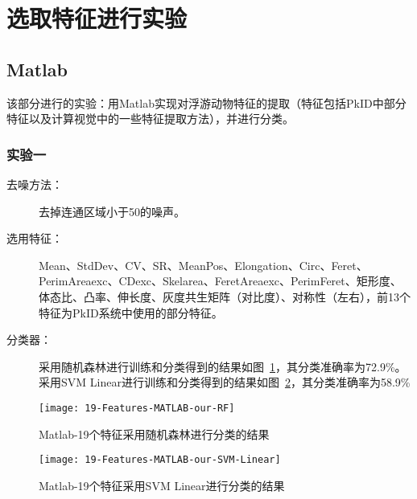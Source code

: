 \section{选取特征进行实验}
\subsection{Matlab}
该部分进行的实验：用Matlab实现对浮游动物特征的提取（特征包括PkID中部分特征以及计算视觉中的一些特征提取方法），并进行分类。

\subsubsection{实验一}
\begin{description}
\item[去噪方法：] 去掉连通区域小于50的噪声。
\item[选用特征：] Mean、StdDev、CV、SR、MeanPos、Elongation、Circ、Feret、PerimAreaexc、CDexc、Skelarea、FeretAreaexc、PerimFeret、矩形度、体态比、凸率、伸长度、灰度共生矩阵（对比度）、对称性（左右），前13个特征为PkID系统中使用的部分特征。
\item[分类器：] 采用随机森林进行训练和分类得到的结果如图~\ref{fig:19-Features-MATLAB-our-RF}，其分类准确率为72.9\%。采用SVM Linear进行训练和分类得到的结果如图~\ref{fig:19-Features-MATLAB-our-SVM-Linear}，其分类准确率为58.9\%
\end{description}
\begin{figure}[!ht]
\centering
\texttt{[image: 19-Features-MATLAB-our-RF]}
\caption{Matlab-19个特征采用随机森林进行分类的结果}
\label{fig:19-Features-MATLAB-our-RF}
\end{figure}

\begin{figure}[!ht]
\centering
\texttt{[image: 19-Features-MATLAB-our-SVM-Linear]}
\caption{Matlab-19个特征采用SVM Linear进行分类的结果}
\label{fig:19-Features-MATLAB-our-SVM-Linear}
\end{figure}